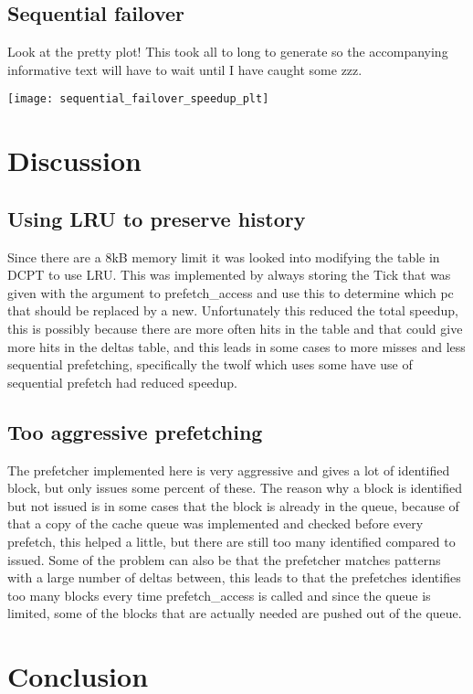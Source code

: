 \documentclass[12pt,journal,compsoc]{IEEEtran}
\begin{document}
\subsection{Sequential failover}
Look at the pretty plot! This took all to long to generate so the accompanying
informative text will have to wait until I have caught some zzz.

\texttt{[image: sequential\_failover\_speedup\_plt]}

\section{Discussion}
\subsection{Using LRU to preserve history}
Since there are a 8kB memory limit it was looked into modifying the table in DCPT to use LRU. This was implemented by always storing the Tick that was given with the argument to prefetch\_access and use this to determine which pc that should be replaced by a new. Unfortunately this reduced the total speedup, this is possibly because there are more often hits in the table and that could give more hits in the deltas table, and this leads in some cases to more misses and less sequential prefetching, specifically the twolf which uses some have use of sequential prefetch had reduced speedup.

\subsection{Too aggressive prefetching}
The prefetcher implemented here is very aggressive and gives a lot of identified block, but only issues some percent of these. The reason why a block is identified but not issued is in some cases that the block is already in the queue, because of that a copy of the cache queue was implemented and checked before every prefetch, this helped a little, but there are still too many identified compared to issued. Some of the problem can also be that the prefetcher matches patterns with a large number of deltas between, this leads to that the prefetches identifies too many blocks every time prefetch\_access is called and since the queue is limited, some of the blocks that are actually needed are pushed out of the queue. %
\section{Conclusion}
\end{document}
